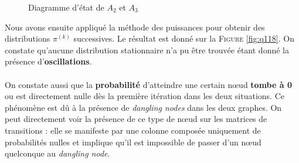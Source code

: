 \documentclass[a4paper,titlepage]{report}
\begin{document}
\begin{figure}[h]
	\center
	\caption{Diagramme d'état de $A_2$ et $A_3$}
	\label{fig:Q23}
\end{figure} 
Nous avons ensuite appliqué la méthode des puissances pour obtenir des distributions $\pi^{(k)}$ successives. Le résultat est donné sur la \textsc{Figure} \ref{fig:q118}. On constate qu'aucune distribution stationnaire n'a pu être trouvée étant donné la présence d'\textbf{oscillations}.
\paragraph{}
On constate aussi que la \textbf{probabilité} d'atteindre une certain nœud \textbf{tombe à 0} ou est directement nulle dès la première itération dans les deux situations. Ce phénomène est dû à la présence de \textit{dangling nodes} dans les deux graphes. On peut directement voir la présence de ce type de nœud sur les matrices de transitions : elle se manifeste par une colonne composée uniquement de probabilités nulles et implique qu'il est impossible de passer d'un nœud quelconque au \textit{dangling node}.
\end{document}

